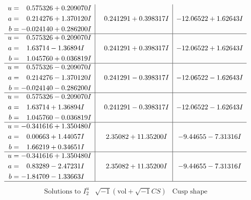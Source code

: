 \documentclass[1p]{elsarticle_modified}
\theoremstyle{definition}
\newcommand{\I}{\sqrt{-1}}
\begin{document}
$$\begin{array}{c|c|c}
\begin{aligned}
u &= \phantom{-}0.575326 + 0.209070 I \\
a &= \phantom{-}0.214276 + 1.370120 I \\
b &= -0.024140 + 0.286200 I\end{aligned}
 & \phantom{-}0.241291 + 0.398317 I & -12.06522 + 1.62643 I \\ \hline\begin{aligned}
u &= \phantom{-}0.575326 + 0.209070 I \\
a &= \phantom{-}1.63714 - 1.36894 I \\
b &= \phantom{-}1.045760 + 0.036819 I\end{aligned}
 & \phantom{-}0.241291 + 0.398317 I & -12.06522 + 1.62643 I \\ \hline\begin{aligned}
u &= \phantom{-}0.575326 - 0.209070 I \\
a &= \phantom{-}0.214276 - 1.370120 I \\
b &= -0.024140 - 0.286200 I\end{aligned}
 & \phantom{-}0.241291 - 0.398317 I & -12.06522 - 1.62643 I \\ \hline\begin{aligned}
u &= \phantom{-}0.575326 - 0.209070 I \\
a &= \phantom{-}1.63714 + 1.36894 I \\
b &= \phantom{-}1.045760 - 0.036819 I\end{aligned}
 & \phantom{-}0.241291 - 0.398317 I & -12.06522 - 1.62643 I \\ \hline\begin{aligned}
u &= -0.341616 + 1.350480 I \\
a &= \phantom{-}0.00663 + 1.44057 I \\
b &= \phantom{-}1.66219 + 0.34651 I\end{aligned}
 & \phantom{-}2.35082 + 11.35200 I & -9.44655 - 7.31316 I \\ \hline\begin{aligned}
u &= -0.341616 + 1.350480 I \\
a &= \phantom{-}0.83289 - 2.47231 I \\
b &= -1.84709 - 1.33663 I\end{aligned}
 & \phantom{-}2.35082 + 11.35200 I & -9.44655 - 7.31316 I\\
 \hline 
 \end{array}$$\newpage$$\begin{array}{c|c|c}  
\text{Solutions to }I^u_{2}& \I (\text{vol} + \sqrt{-1}CS) & \text{Cusp shape}\\

\end{array}$$
\end{document}
